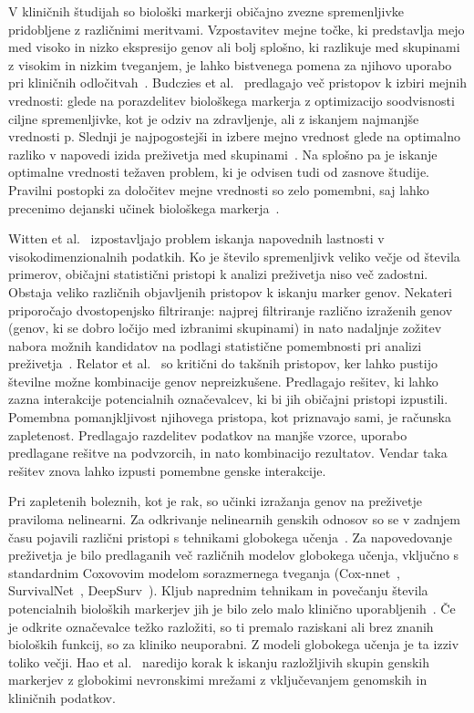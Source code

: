 \documentclass[11pt,a4paper]{article}
\begin{document}
V kliničnih študijah so biološki markerji običajno zvezne spremenljivke pridobljene z različnimi meritvami. Vzpostavitev mejne točke, ki predstavlja mejo med visoko in nizko ekspresijo genov ali bolj splošno, ki razlikuje med skupinami z visokim in nizkim tveganjem, je lahko bistvenega pomena za njihovo uporabo pri kliničnih odločitvah~\cite{mazumdar2000categorizing}. Budczies et al.~\cite{budczies2012cutoff} predlagajo več pristopov k izbiri mejnih vrednosti: glede na porazdelitev biološkega markerja z optimizacijo soodvisnosti ciljne spremenljivke, kot je odziv na zdravljenje, ali z iskanjem najmanjše vrednosti p. Slednji je najpogostejši in izbere mejno vrednost glede na optimalno razliko v napovedi izida preživetja med skupinami~\cite{woo2020determination}. Na splošno pa je iskanje optimalne vrednosti težaven problem, ki je odvisen tudi od zasnove študije. Pravilni postopki za določitev mejne vrednosti so zelo pomembni, saj lahko precenimo dejanski učinek biološkega markerja~\cite{Altman1991}.

Witten et al.~\cite{witten2010survival} izpostavljajo problem iskanja napovednih lastnosti v visokodimenzionalnih podatkih. Ko je število spremenljivk veliko večje od števila primerov, običajni statistični pristopi k analizi preživetja niso več zadostni. Obstaja veliko različnih objavljenih pristopov k iskanju marker genov. Nekateri priporočajo dvostopenjsko filtriranje: najprej filtriranje različno izraženih genov (genov, ki se dobro ločijo med izbranimi skupinami) in nato nadaljnje zožitev nabora možnih kandidatov na podlagi statistične pomembnosti pri analizi preživetja~\cite{wang2017identification,liao2018identification,zhang2011discovery,kim2013identification}. Relator et al.~\cite{relator2018identifying} so kritični do takšnih pristopov, ker lahko pustijo številne možne kombinacije genov nepreizkušene. Predlagajo rešitev, ki lahko zazna interakcije potencialnih označevalcev, ki bi jih običajni pristopi izpustili. Pomembna pomanjkljivost njihovega pristopa, kot priznavajo sami, je računska zapletenost. Predlagajo razdelitev podatkov na manjše vzorce, uporabo predlagane rešitve na podvzorcih, in nato kombinacijo rezultatov. Vendar taka rešitev znova lahko izpusti pomembne genske interakcije.

Pri zapletenih boleznih, kot je rak, so učinki izražanja genov na preživetje praviloma nelinearni. Za odkrivanje nelinearnih genskih odnosov so se v zadnjem času pojavili različni pristopi s tehnikami globokega učenja~\cite{hao2019interpretable}. Za napovedovanje preživetja je bilo predlaganih več različnih modelov globokega učenja, vključno s standardnim Coxovovim modelom sorazmernega tveganja (Cox-nnet~\cite{ching2018cox}, SurvivalNet~\cite {yousefi2017predicting}, DeepSurv~\cite{katzman2018deepsurv}). Kljub naprednim tehnikam in povečanju števila potencialnih bioloških markerjev jih je bilo zelo malo klinično uporabljenih~\cite{burke2016predicting}. Če je odkrite označevalce težko razložiti, so ti premalo raziskani ali brez znanih bioloških funkcij, so za kliniko neuporabni. Z modeli globokega učenja je ta izziv toliko večji. Hao et al.~\cite{hao2019interpretable} naredijo korak k iskanju razložljivih skupin genskih markerjev z globokimi nevronskimi mrežami z vključevanjem genomskih in kliničnih podatkov.
\end{document}
